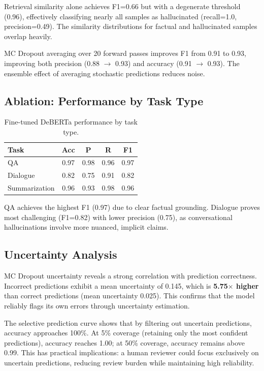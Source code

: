 \documentclass[11pt]{article}
\begin{document}
Retrieval similarity alone achieves F1=0.66 but with a degenerate threshold (0.96), effectively classifying nearly all samples as hallucinated (recall=1.0, precision=0.49). The similarity distributions for factual and hallucinated samples overlap heavily.

MC Dropout averaging over 20 forward passes improves F1 from 0.91 to 0.93, improving both precision (0.88 $\rightarrow$ 0.93) and accuracy (0.91 $\rightarrow$ 0.93). The ensemble effect of averaging stochastic predictions reduces noise.

\subsection{Ablation: Performance by Task Type}

\begin{table}[h]
\centering
\small
\begin{tabular}{lcccc}
\toprule
\textbf{Task} & \textbf{Acc} & \textbf{P} & \textbf{R} & \textbf{F1} \\
\midrule
QA & 0.97 & 0.98 & 0.96 & 0.97 \\
Dialogue & 0.82 & 0.75 & 0.91 & 0.82 \\
Summarization & 0.96 & 0.93 & 0.98 & 0.96 \\
\bottomrule
\end{tabular}
\caption{Fine-tuned DeBERTa performance by task type.}
\label{tab:task_results}
\end{table}

QA achieves the highest F1 (0.97) due to clear factual grounding. Dialogue proves most challenging (F1=0.82) with lower precision (0.75), as conversational hallucinations involve more nuanced, implicit claims.

\subsection{Uncertainty Analysis}

MC Dropout uncertainty reveals a strong correlation with prediction correctness. Incorrect predictions exhibit a mean uncertainty of 0.145, which is \textbf{5.75$\times$ higher} than correct predictions (mean uncertainty 0.025). This confirms that the model reliably flags its own errors through uncertainty estimation.

The selective prediction curve shows that by filtering out uncertain predictions, accuracy approaches 100\%. At 5\% coverage (retaining only the most confident predictions), accuracy reaches 1.00; at 50\% coverage, accuracy remains above 0.99. This has practical implications: a human reviewer could focus exclusively on uncertain predictions, reducing review burden while maintaining high reliability.
\end{document}
